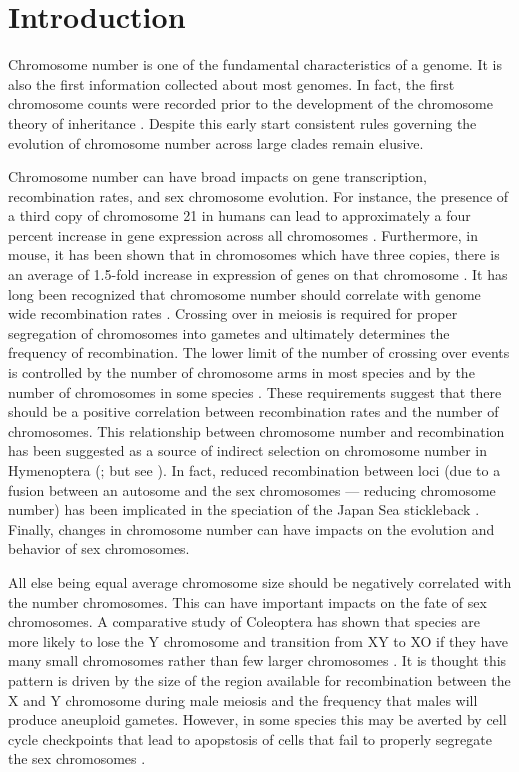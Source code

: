 \section{Introduction}
Chromosome number is one of the fundamental characteristics of a genome.
It is also the first information collected about most genomes. 
In fact, the first chromosome counts were recorded prior to the development of the chromosome theory of inheritance \citep{flemming1882}.
Despite this early start consistent rules governing the evolution of chromosome number across large clades remain elusive. 

Chromosome number can have broad impacts on gene transcription, recombination rates, and sex chromosome evolution. 
For instance, the presence of a third copy of chromosome 21 in humans can lead to approximately a four percent increase in gene expression across all chromosomes \citep{lockstone2007}.
Furthermore, in mouse, it has been shown that in chromosomes which have three copies, there is an average of 1.5-fold increase in expression of genes on that chromosome \citep{williams2008aneuploidy}. 
It has long been recognized that chromosome number should correlate with genome wide recombination rates \citep{stebbins1958}.
Crossing over in meiosis is required for proper segregation of chromosomes into gametes and ultimately determines the frequency of recombination.
The lower limit of the number of crossing over events is controlled by the number of chromosome arms in most species and by the number of chromosomes in some species \citep{dumont2017req}.
These requirements suggest that there should be a positive correlation between recombination rates and the number of chromosomes. 
This relationship between chromosome number and recombination has been suggested as a source of indirect selection on chromosome number in Hymenoptera (\citealt{sherman1979}; but see \citealt{ross2015}).
In fact, reduced recombination between loci (due to a fusion between an autosome and the sex chromosomes --- reducing chromosome number) has been implicated in the speciation of the Japan Sea stickleback \citep{kitano2012}. 
Finally, changes in chromosome number can have impacts on the evolution and behavior of sex chromosomes. 

All else being equal average chromosome size should be negatively correlated with the number chromosomes.
This can have important impacts on the fate of sex chromosomes.
A comparative study of Coleoptera has shown that species are more likely to lose the Y chromosome and transition from XY to XO if they have many small chromosomes rather than few larger chromosomes \citep{blackmon2015bioessay}.
It is thought this pattern is driven by the size of the region available for recombination between the X and Y chromosome during male meiosis and the frequency that males will produce aneuploid gametes\citep{blackmon2014}.
However, in some species this may be averted by cell cycle checkpoints that lead to apopstosis of cells that fail to properly segregate the sex chromosomes \citep{dumont2017par}.

